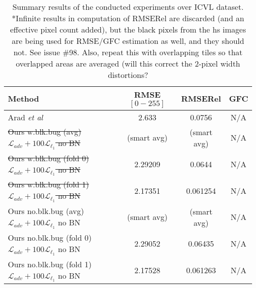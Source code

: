 \documentclass{bmvc2k}
\def\etal{\emph{et al}\bmvaOneDot}
\begin{document}
\begin{table}%
	\begin{center}
		\begin{tabular}{|l|ccc|}
			\hline
			Method & RMSE $[0-255]$ & RMSERel & GFC \\
			\hline\hline
			Arad \etal\cite{arad_sparse_2016} & 2.633 & 0.0756 & N/A\\
            \hline
			\sout{Ours w.blk.bug (avg) $\mathcal{L}_{adv} + 100\mathcal{L}_{\ell_1}$ no BN} & (smart avg) & (smart avg) & N/A\\
   			\sout{Ours w.blk.bug (fold 0)$\mathcal{L}_{adv} + 100\mathcal{L}_{\ell_1}$ no BN} & 2.29209 & 0.0644 & N/A\\          
			\sout{Ours w.blk.bug (fold 1)$\mathcal{L}_{adv} + 100\mathcal{L}_{\ell_1}$ no BN} & 2.17351 & 0.061254 & N/A\\
			\hline
            Ours no.blk.bug (avg) $\mathcal{L}_{adv} + 100\mathcal{L}_{\ell_1}$ no BN & (smart avg) & (smart avg) & N/A\\
			Ours no.blk.bug (fold 0)$\mathcal{L}_{adv} + 100\mathcal{L}_{\ell_1}$ no BN & 2.29052 & 0.06435 & N/A\\
   			Ours no.blk.bug (fold 1)$\mathcal{L}_{adv} + 100\mathcal{L}_{\ell_1}$ no BN & 2.17528 & 0.061263 & N/A\\
            \hline
		\end{tabular}
	\end{center}
	\caption{Summary results of the conducted experiments over ICVL dataset. *Infinite results in computation of RMSERel are discarded (and an effective pixel count added), but the black pixels from the hs images are being used for RMSE/GFC estimation as well, and they should not. See issue \#98. Also, repeat this with overlapping tiles so that overlapped areas are averaged (will this correct the 2-pixel width distortions?}
    \label{tab:results}
\end{table}
\end{document}
